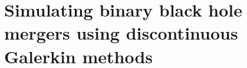 \chapter{Simulating binary black hole mergers using discontinuous Galerkin
  methods\label{ch:lovelace_nelli}}


\begin{bibunit}[unsrtnat]



\end{bibunit}
